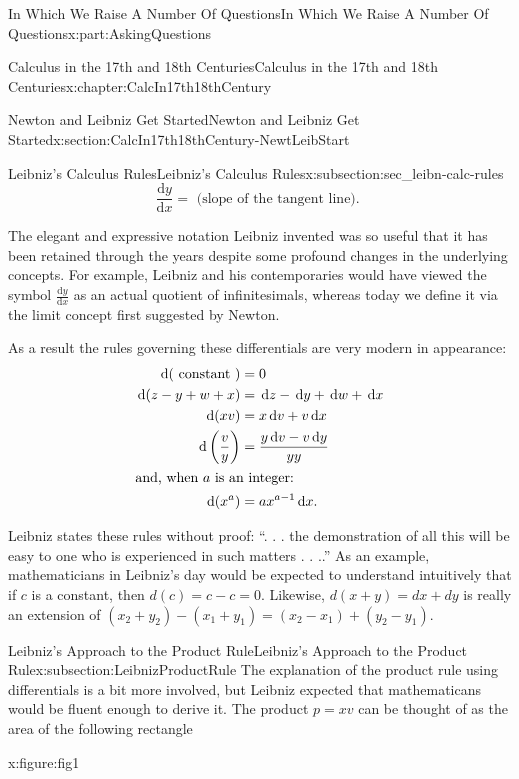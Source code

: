 \documentclass[oneside,10pt,]{book}
\numberwithin{equation}{section}
\newcommand{\dx}[1]{\,{\rm d}#1}
\newcommand{\dfdx}[2]{\frac{\text{d}{#1}}{\text{d}{#2}}}
\newcommand{\amp}{&}
\begin{document}
\begin{partptx}{In Which We Raise A Number Of Questions}{}{In Which We Raise A Number Of Questions}{}{}{x:part:AskingQuestions}
\begin{chapterptx}{Calculus in the 17th and 18th Centuries}{}{Calculus in the 17th and 18th Centuries}{}{}{x:chapter:CalcIn17th18thCentury}
\begin{sectionptx}{Newton and Leibniz Get Started}{}{Newton and Leibniz Get Started}{}{}{x:section:CalcIn17th18thCentury-NewtLeibStart}
\begin{subsectionptx}{Leibniz's Calculus Rules}{}{Leibniz's Calculus Rules}{}{}{x:subsection:sec_leibn-calc-rules}
\begin{equation*}
\dfdx{y}{x}= \text{ (slope of the tangent line). }
\end{equation*}
%
\par
The elegant and expressive notation Leibniz invented was so useful that it has been retained through the years despite some profound changes in the underlying concepts.  For example, Leibniz and his contemporaries would have viewed the symbol \(\dfdx{y}{x}\) as an actual quotient of infinitesimals, whereas today we define it via the limit concept first suggested by Newton.  %
\par
As a result the rules governing these differentials are very modern in appearance: %
\begin{align*}
\dx{(\text{ constant } )}\amp =0\\
\dx{(z-y+w+x)}\amp =\dx{ z}-\dx{ y}+\dx{ w}+\dx{ x}\\
\dx{(xv)}\amp =x\dx{ v}+v\dx{ x}\\
\dx{\left(\frac{v}{y}\right)}\amp =\frac{y\dx{ v}-v\dx{ y}}{yy}\\
\intertext{and, when \(a\) is an integer:}
\dx{(x^a)}\amp =ax^{a-1}\dx{ x}\text{.}
\end{align*}
%
\par
Leibniz states these rules without proof: ``. . . the demonstration of all this will be easy to one who is experienced in such matters . . ..'' As an example, mathematicians in Leibniz's day would be expected to understand intuitively that if \(c\) is a constant, then \(d(c)=c-c=0\).  Likewise, \(d(x+y)=dx+dy\) is really an extension of \((x_2+y_2)-(x_1+y_1)=(x_2-x_1)+(y_2-y_1)\).%
\end{subsectionptx}
%
%
\typeout{************************************************}
\typeout{************************************************}
%
\begin{subsectionptx}{Leibniz's Approach to the Product Rule}{}{Leibniz's Approach to the Product Rule}{}{}{x:subsection:LeibnizProductRule}
 The explanation of the product rule using differentials is a bit more involved, but Leibniz expected that mathematicans would be fluent enough to derive it.  The product \(p=xv\) can be thought of as the area of the following rectangle%
\begin{figureptx}{}{x:figure:fig1}{}%
\begin{image}{0.25}{0.5}{0.25}%

\end{image}
\end{figureptx}
\end{subsectionptx}
\end{sectionptx}
\end{chapterptx}
\end{partptx}
\end{document}
